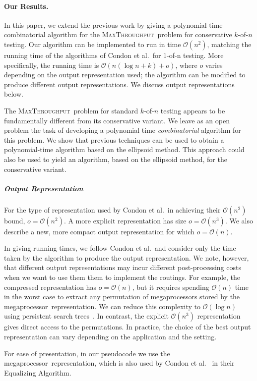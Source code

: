 \documentclass{article}
\newcommand{\ens}[1]{\ensuremath{#1}}					\newcommand{\card}[1]{\ens{|#1|}}							\newcommand{\dotlist}[2]{\ens{#1,\ldots,#2}}
\newcommand{\bigoh}[1]{\ens{\mathcal{O}(#1)}}				\newcommand{\bigom}[1]{\ens{\Omega(#1)}}
\newcommand{\valn}{\ens{n}}
\newcommand{\valk}{\ens{k}}
\newcommand{\maxthru}{\textsc{MaxThroughput}}
\newcommand{\kofn}{\valk-of-\valn}
\newcommand{\processor}{processor}
\newcommand{\megaprocessor}{mega\processor}
\begin{document}
\paragraph{Our Results.} In this paper, we extend the previous work by giving a polynomial-time
combinatorial algorithm for the \maxthru\ problem for
conservative \kofn{} testing.
Our algorithm can be implemented to run in time 
\bigoh{n^2}, matching the running time of the algorithms of
Condon et al.~for 1-of-n testing.
More specifically, the running time
is \bigoh{\valn(\log \valn + \valk) + o}, where $o$ varies depending on the
output representation used;
the algorithm can be modified to produce different output representations. We discuss output representations below. 

The \maxthru\ problem for
standard \kofn{} testing appears to be fundamentally different
from its conservative variant.
We leave as an open problem the task of developing
a polynomial time {\em combinatorial} algorithm for this problem.
We show that previous techniques can
be used to obtain a polynomial-time
algorithm based on the ellipsoid method. This approach
could also be used to yield an algorithm, based on the
ellipsoid method, for the conservative variant.

\subparagraph{Output Representation}
For the type of representation used by Condon et al.~in achieving their
\bigoh{n^2} bound, $o = \bigoh{n^2}$.  A more explicit representation
has size $o = \bigoh{n^3}$.
We also describe a new, more compact output representation for which
$o = \bigoh{\valn}$. 

In giving running times, we follow Condon et al.~and 
consider only the time taken by the algorithm 
to produce the output representation.
We note, however, that different output representations may
incur different post-processing costs when we want to use them
them to implement the routings.
For example, the compressed representation has $o = \bigoh{n}$, 
but it requires spending \bigoh{n} time in the worst case 
to extract any permutation of \megaprocessor s stored by the 
\megaprocessor\ representation. We can reduce this complexity to 
\bigoh{\log n} using persistent 
search trees~\cite{DBLP:journals/cacm/SarnakT86}.  
In contrast, the explicit $\bigoh{n^3}$ representation gives direct access
to the permutations.
In practice, the choice of the best output representation can vary
depending on the application and the setting.

For ease of presentation, in our pseudocode we use the \megaprocessor\ representation, which is also used by Condon et al.~\cite{journals/talg/CondonDHW09} in their Equalizing Algorithm.
\end{document}
